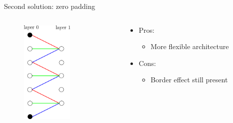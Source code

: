 \documentclass[xcolor=pdftex,dvipsnames,table,mathserif]{beamer}
\begin{document}
\begin{frame}{Second solution: zero padding}

\begin{columns}
  \begin{column}{.5\textwidth}
  \begin{figure}
    \includegraphics[height=5cm]{conv_border_effect3}
  \end{figure}
\end{column}

  \begin{column}{.5\textwidth}

  \begin{itemize}
  \item Pros:
    \begin{itemize}
    \item More flexible architecture
    \end{itemize}
  \item Cons:
    \begin{itemize}
    \item Border effect still present
    \end{itemize}
  \end{itemize}
  \end{column}
\end{columns}


\end{frame}
\end{document}
